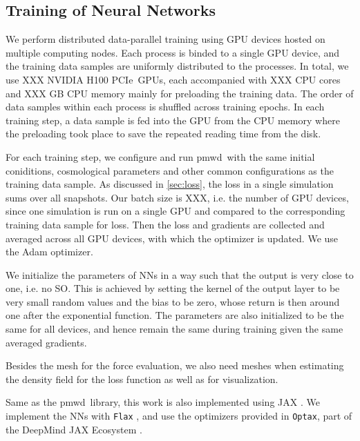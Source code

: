 \documentclass[modern, trackchanges, dvipsnames]{aastex631}
\newcommand{\pmwd}{{\usefont{T1}{nova}{m}{sl}pmwd}}
\newcommand{\GPU}{NVIDIA H100 PCIe}  %
\begin{document}
\subsection{Training of Neural Networks}

We perform distributed data-parallel training using GPU devices hosted
on multiple computing nodes.
Each process is binded to a single GPU device, and the training data
samples are uniformly distributed to the processes.
In total, we use XXX \GPU\ GPUs, each accompanied with XXX CPU cores
and XXX GB CPU memory mainly for preloading the training data.
The order of data samples within each process is shuffled across
training epochs.
In each training step, a data sample is fed into the GPU from the CPU
memory where the preloading took place to save the repeated reading time
from the disk.

For each training step, we configure and run \pmwd\ with the same
initial coniditions, cosmological parameters and other common
configurations as the training data sample.
As discussed in \autoref{sec:loss}, the loss in a single simulation sums
over all snapshots.
Our batch size is XXX, i.e. the number of GPU devices, since one
simulation is run on a single GPU and compared to the corresponding
training data sample for loss.
Then the loss and gradients are collected and averaged across all GPU
devices, with which the optimizer is updated.
We use the Adam \citep{Adam} optimizer.

We initialize the parameters of NNs in a way such that the output is
very close to one, i.e. no SO.
This is achieved by setting the kernel of the output layer to be very
small random values and the bias to be zero, whose return is then around
one after the exponential function.
The parameters are also initialized to be the same for all devices, and
hence remain the same during training given the same averaged gradients.



Besides the mesh for the force evaluation, we also need meshes when
estimating the density field for the loss function as well as for
visualization.

Same as the \pmwd\ library, this work is also implemented using JAX
\citep{JAX}.
We implement the NNs with \texttt{Flax} \citep{flax2020github}, and use
the optimizers provided in \texttt{Optax}, part of the DeepMind JAX
Ecosystem \citep{deepmind2020jax}.
\end{document}
